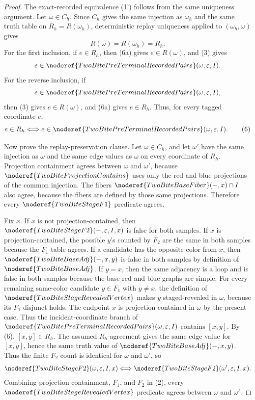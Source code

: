 \begin{proof}
The exact-recorded equivalence (1') follows from the same uniqueness argument.
Let \(\omega\in C_h\).  Since \(C_h\) gives the same injection as \(\omega_h\)
and the same truth table on \(R_h=R(\omega_h)\), deterministic replay
uniqueness applied to \((\omega_h,\omega)\) gives
\[
R(\omega)=R(\omega_h)=R_h.
\tag{6a}
\]
For the first inclusion, if \(e\in R_h\), then (6a) gives
\(e\in R(\omega)\), and (3) gives
\[
e\in\noderef{TwoBitePreTerminalRecordedPairs}(\omega,\varepsilon,I).
\]
For the reverse inclusion, if
\[
e\in\noderef{TwoBitePreTerminalRecordedPairs}(\omega,\varepsilon,I),
\]
then (3) gives \(e\in R(\omega)\), and (6a) gives \(e\in R_h\).  Thus, for
every tagged coordinate \(e\),
\[
e\in R_h
\Longleftrightarrow
e\in\noderef{TwoBitePreTerminalRecordedPairs}(\omega,\varepsilon,I).
\tag{6}
\]

Now prove the replay-preservation clause.  Let \(\omega\in C_h\), and let
\(\omega'\) have the same injection as \(\omega\) and the same edge values as
\(\omega\) on every coordinate of \(R_h\).  Projection containment agrees
between \(\omega\) and \(\omega'\), because
\(\noderef{TwoBiteProjectionContains}\) uses only the red and blue projections
of the common injection.  The fibers
\(\noderef{TwoBiteBaseFiber}(-,x)\cap I\) also agree, because the fibers are
defined by those same projections.  Therefore every
\(\noderef{TwoBiteStageF1}\) predicate agrees.

Fix \(x\).  If \(x\) is not projection-contained, then
\(\noderef{TwoBiteStageF2}(-,\varepsilon,I,x)\) is false for both samples.  If
\(x\) is projection-contained, the possible \(y\)'s counted by \(F_2\) are the
same in both samples because the \(F_1\) table agrees.  If a candidate has the
opposite color from \(x\), then
\(\noderef{TwoBiteBaseAdj}(-,x,y)\) is false in both samples by definition of
\(\noderef{TwoBiteBaseAdj}\).  If \(y=x\), then the same adjacency is a loop
and is false in both samples because the base red and blue graphs are simple.
For every remaining same-color candidate \(y\in F_1\) with \(y\ne x\), the
definition of \(\noderef{TwoBiteStageRevealedVertex}\) makes \(y\)
staged-revealed in \(\omega\), because its \(F_1\)-disjunct holds.  The
endpoint \(x\) is projection-contained in \(\omega\) by the present case.
Thus the incident-coordinate branch of
\(\noderef{TwoBitePreTerminalRecordedPairs}(\omega,\varepsilon,I)\) contains
\([x,y]\).  By (6), \([x,y]\in R_h\).  The assumed \(R_h\)-agreement gives the
same edge value for \([x,y]\), hence the same truth value of
\(\noderef{TwoBiteBaseAdj}(-,x,y)\).  Thus the finite \(F_2\) count is
identical for \(\omega\) and \(\omega'\), so
\[
\noderef{TwoBiteStageF2}(\omega,\varepsilon,I,x)
\Longleftrightarrow
\noderef{TwoBiteStageF2}(\omega',\varepsilon,I,x).
\]
Combining projection containment, \(F_1\), and \(F_2\) in (2), every
\(\noderef{TwoBiteStageRevealedVertex}\) predicate agrees between \(\omega\)
and \(\omega'\).


\end{proof}

